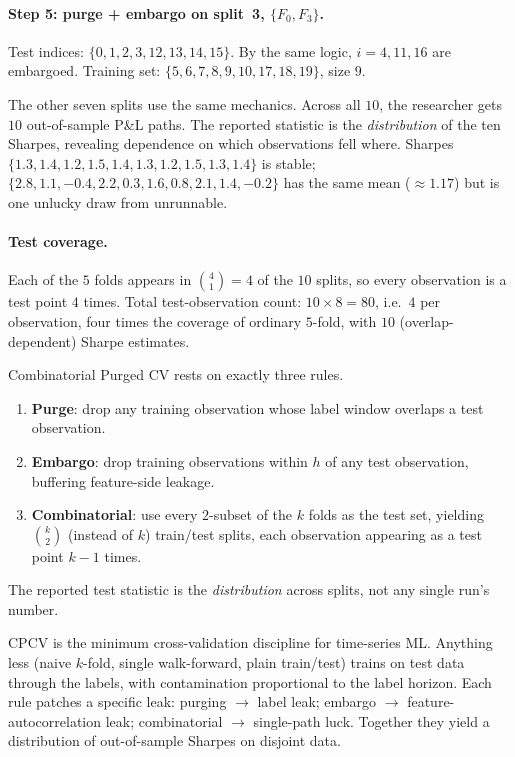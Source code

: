 \paragraph{Step 5: purge + embargo on split~3, $\{F_0, F_3\}$.}
Test indices: $\{0,1,2,3,12,13,14,15\}$. By the same logic, $i = 4,
11, 16$ are embargoed. Training set:
$\{5, 6, 7, 8, 9, 10, 17, 18, 19\}$, size $9$.

The other seven splits use the same mechanics. Across all $10$, the
researcher gets $10$ out-of-sample P\&L paths. The reported statistic
is the \emph{distribution} of the ten Sharpes, revealing dependence
on which observations fell where. Sharpes
$\{1.3, 1.4, 1.2, 1.5, 1.4, 1.3, 1.2, 1.5, 1.3, 1.4\}$ is stable;
$\{2.8, 1.1, -0.4, 2.2, 0.3, 1.6, 0.8, 2.1, 1.4, -0.2\}$ has the
same mean ($\approx 1.17$) but is one unlucky draw from unrunnable.

\paragraph{Test coverage.} Each of the $5$ folds appears in
$\binom{4}{1} = 4$ of the $10$ splits, so every observation is a
test point $4$ times. Total test-observation count:
$10 \times 8 = 80$, i.e.\ $4$ per observation, four times the
coverage of ordinary $5$-fold, with $10$ (overlap-dependent) Sharpe
estimates.

\begin{keyfactbox}
Combinatorial Purged CV rests on exactly three rules.
\begin{enumerate}
  \item \textbf{Purge}: drop any training observation whose
  label window overlaps a test observation.
  \item \textbf{Embargo}: drop training observations within
  $h$ of any test observation, buffering feature-side leakage.
  \item \textbf{Combinatorial}: use every $2$-subset of the
  $k$ folds as the test set, yielding $\binom{k}{2}$
  (instead of $k$) train/test splits, each observation
  appearing as a test point $k - 1$ times.
\end{enumerate}
The reported test statistic is the \emph{distribution} across
splits, not any single run's number.
\end{keyfactbox}

\begin{intuitionbox}
CPCV is the minimum cross-validation discipline for time-series ML.
Anything less (naive $k$-fold, single walk-forward, plain train/test)
trains on test data through the labels, with contamination
proportional to the label horizon. Each rule patches a specific
leak: purging $\to$ label leak; embargo $\to$ feature-autocorrelation
leak; combinatorial $\to$ single-path luck. Together they yield a
distribution of out-of-sample Sharpes on disjoint data.
\end{intuitionbox}

